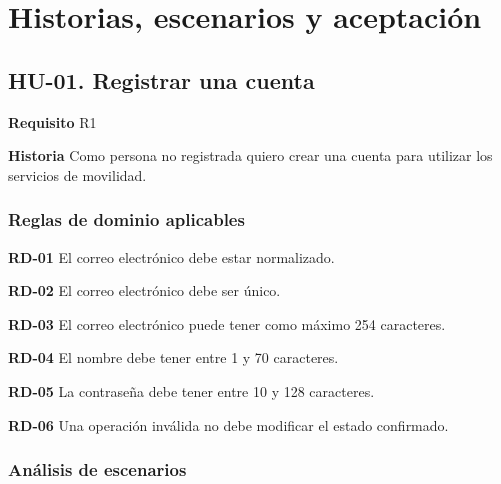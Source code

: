 \begingroup
\clearpage\section{Historias, escenarios y aceptación}\label{sec4}
\setlength{\parskip}{3pt}
\fontsize{10}{13}\selectfont
\renewcommand{\arraystretch}{1.0}
\titlespacing*{\subsection}{0pt}{8pt}{4pt}
\titlespacing*{\subsubsection}{0pt}{7pt}{4pt}

\subsection*{HU-01. Registrar una cuenta}

\textbf{Requisito} R1\par

\textbf{Historia} Como persona no registrada quiero crear una cuenta para utilizar los servicios de movilidad.\par

\subsubsection*{Reglas de dominio aplicables}

\textbf{RD-01} El correo electrónico debe estar normalizado.\par

\textbf{RD-02} El correo electrónico debe ser único.\par

\textbf{RD-03} El correo electrónico puede tener como máximo 254 caracteres.\par

\textbf{RD-04} El nombre debe tener entre 1 y 70 caracteres.\par

\textbf{RD-05} La contraseña debe tener entre 10 y 128 caracteres.\par

\textbf{RD-06} Una operación inválida no debe modificar el estado confirmado.\par

\subsubsection*{Análisis de escenarios}

